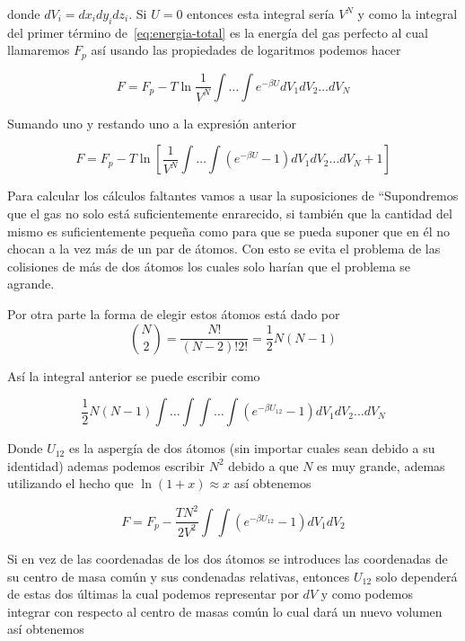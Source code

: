 donde $dV_i = dx_i dy_i dz_i$. Si $U = 0$ entonces esta integral sería
$V^N$ y como la integral del primer término de~\ref{eq:energia-total}
es la energía del gas perfecto al cual llamaremos $F_p$ así
usando las propiedades de logaritmos podemos hacer

\begin{equation}
    F = F_p - T \ln \frac{1}{V^N} \int\ldots\int e^{-\beta U} dV_1dV_2 \ldots dV_N
\end{equation}

Sumando uno y restando uno a la expresión anterior

\begin{equation}
    F = F_p - T \ln  \left[\frac{1}{V^N} \int\ldots\int \left(e^{-\beta U}  - 1\right)dV_1dV_2 \ldots dV_N + 1\right]
\end{equation}

Para calcular los cálculos faltantes vamos a usar la suposiciones de
\parencite[p.~262]{landau} ``Supondremos que el gas no solo está suficientemente
enrarecido, si también que la cantidad del mismo es suficientemente pequeña 
como para que se pueda suponer que en él no chocan a la vez más de un par de átomos.
Con esto se evita el problema de las colisiones de más de dos átomos los cuales solo
harían que el problema se agrande.

Por otra  parte la forma de elegir estos átomos está dado por
\begin{equation}
    \binom{N}{2} = \frac{N!}{(N - 2)! 2!} = \frac{1}{2}N(N - 1)
\end{equation}

Así la integral anterior se puede escribir como

\begin{equation}
    \frac{1}{2}N(N - 1)
    \int\ldots\int \int\ldots\int \left(e^{-\beta U_{12}}  - 1\right)dV_1dV_2 \ldots dV_N
\end{equation}

Donde $U_{12}$ es la aspergía de dos átomos (sin importar cuales sean debido
a su identidad) ademas podemos escribir $N^2$ debido a que $N$ es muy grande,
ademas utilizando el hecho que $\ln(1 + x) \approx x$
así obtenemos

\begin{equation}
    F = F_p - \frac{TN^2}{2V^2}\int\int(e^{-\beta U_{12}} - 1) dV_1 dV_2
\end{equation}

Si en vez de las coordenadas de los dos átomos se introduces las coordenadas
de su centro de masa común y sus condenadas relativas, entonces
$U_{12}$ solo dependerá de estas dos últimas la cual podemos representar por
$dV$ y como podemos integrar con respecto al centro de masas común lo
cual dará un nuevo volumen así obtenemos

